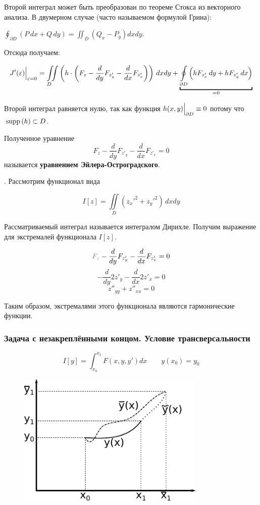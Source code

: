 \documentclass[12pt]{article}
\begin{document}
			Второй интеграл может быть преобразован по теореме Стокса из векторного анализа. В двумерном случае (часто называемом формулой Грина):

			$\oint_{\partial D} (P\,dx + Q\,dy) = \iint_{D} (Q_x - P_y) dx dy$.

			Отсюда получаем:

			$$
				J'(\varepsilon)\lims{\varepsilon = 0}{} = 
				\underset{D\hspace{10pt}}{\iint} \left( h\cdot\left(F_z - \frac{d}{dy}F_{z'_y} - \frac{d}{dx}F_{z'_x}\right) \right) \,dxdy
				+ \underbracket{\underset{\partial D}{\oint} \left(hF_{z'_x}\,dy + hF_{z'_y}\,dx \right)}_{=0}
			$$

			Второй интеграл равняется нулю, так как функция $h(x, y)\Big|_{\partial D}^{} \equiv 0$ потому что $\,\text{supp}\,(h) \subset D$.

			Полученное уравнение
			$$F_z - \frac{d}{dy}F_{z'_y} - \frac{d}{dx}F_{z'_x} = 0$$
			называется \textbf{уравнением Эйлера-Остроградского}.

			. Рассмотрим функционал вида 
	
				$$I[z] = \iint\limits_D \left(z_x'^2 + z_y'^2\right) \,dxdy$$
	
				Рассматриваемый интеграл называется интегралом Дирихле. Получим выражение для экстремалей
				функционала $I[z]$.
	
				$$\off{F_z} - \frac{d}{dy} F_{z'_y} - \frac{d}{dx} F_{z'_x} = 0$$
				$$-\frac{d}{dy} 2z'_y - \frac{d}{dx} 2z'_x = 0$$
				$$z''_{yy} + z''_{xx} = 0$$
	
				Таким образом, экстремалями этого функционала являются гармонические функции.

		\subsubsection{Задача с незакреплёнными концом. Условие трансверсальности}

			$$I[y] = \int_{x_0}^{x_1} F(x, y, y')dx \qquad y(x_0) = y_0$$
	
			\begin{figure}
				\includegraphics[width=0.8\textwidth]{./../Graphics/Lectures-12-unknowntask.pdf}
			\end{figure}
	
\end{document}
